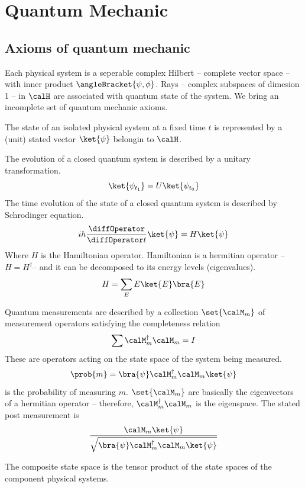 \chapter{Quantum Mechanic}
\section{Axioms of quantum mechanic}
Each physical system is a seperable complex Hilbert -- complete vector space -- with inner product \(\angleBracket{\psi,\phi}\). Rays -- complex subspaces of dimesion 1 -- in \(\calH\) are associated with quantum state of the system. We bring an incomplete set of quantum mechanic axioms.

\begin{definition}
    \item [Postulate I:] The state of an isolated physical system at a fixed time \(t\) is represented by a (unit) stated vector \(\ket{\psi}\) belongin to \(\calH\).
    \item [Postulate II:] The evolution of a closed quantum system is described by a unitary transformation.
    \begin{equation*}
        \ket{\psi_{t_1}} = U \ket{\psi_{t_0}}
    \end{equation*}
    The time evolution of the state of a closed quantum system is described by Schrodinger equation.
    \begin{equation*}
        ih \dfrac{\diffOperator}{\diffOperator t} \ket{\psi} = H \ket{\psi}
    \end{equation*}
    Where \(H\) is the Hamiltonian operator. Hamiltonian is a hermitian operator -- \(H = H^{\dagger}\)-- and it can be decomposed to its energy levels (eigenvalues).
    \begin{equation*}
        H = \sum_{E} E \ket{E} \bra{E}
    \end{equation*}

    \item [Postulate III:] Quantum measurements are described by a collection \(\set{\calM_m}\) of measurement operators satisfying the completeness relation
    \begin{equation*}
        \sum \calM_m^{\dagger} \calM_m = I
    \end{equation*}
    These are operators acting on the state space of the system being measured.
    \begin{equation*}
        \prob{m} = \bra{\psi} \calM_m^{\dagger} \calM_m \ket{\psi}
    \end{equation*} 
    is the probability of measuring \(m\). \(\set{\calM_m}\) are basically the eigenvectors of a hermitian operator -- therefore, \(\calM_m^{\dagger} \calM_m \) is the eigenspace. The stated post measurement is 
    \begin{equation*}
        \dfrac{\calM_m \ket{\psi}}{\sqrt{\bra{\psi} \calM_m^{\dagger} \calM_m \ket{\psi}}}
    \end{equation*}
    \item [Postulate IV:] The composite state space is the tensor product of the state spaces of the component physical  systems.
\end{definition}

